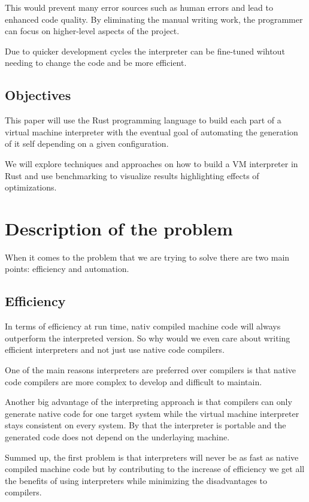 \documentclass{article}
\begin{document}
This would prevent many error sources such as human errors and lead to enhanced
code quality. By eliminating the manual writing work, the programmer can focus
on higher-level aspects of the project.

Due to quicker development cycles the interpreter can be fine-tuned wihtout
needing to change the code and be more efficient.

\subsection{Objectives}
This paper will use the Rust programming language to build each part of a virtual machine 
interpreter with the eventual goal of automating the generation of it self depending on
a given configuration.

We will explore techniques and approaches on how to build a VM interpreter in
Rust and use benchmarking to visualize results highlighting effects of
optimizations.

\section{Description of the problem}
When it comes to the problem that we are trying to solve there are two main
points: efficiency and automation.

\subsection{Efficiency}
In terms of efficiency at run time, nativ compiled machine code will always
outperform the interpreted version. So why would we even care about writing
efficient interpreters and not just use native code compilers.

One of the main reasons interpreters are preferred over compilers is that 
native code compilers are more complex to develop and difficult to maintain.
~\cite{structure_and_performance}

Another big advantage of the interpreting approach is that compilers can only
generate native code for one target system while the virtual machine
interpreter stays consistent on every system. By that the interpreter is
portable and the generated code does not depend on the underlaying machine.

Summed up, the first problem is that interpreters will never be as fast as
native compiled machine code but by contributing to the increase of efficiency
we get all the benefits of using interpreters while minimizing the
disadvantages to compilers.
\end{document}

